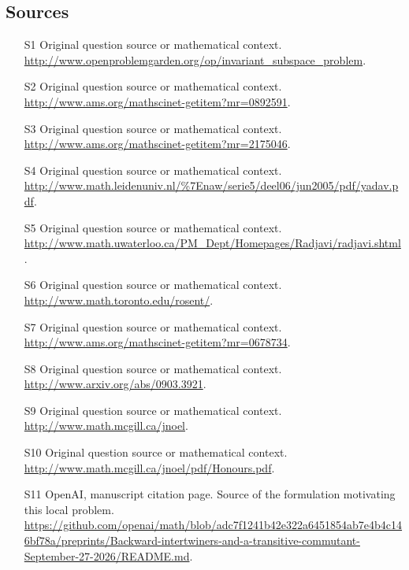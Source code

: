 \documentclass[11pt]{article}
\begin{document}
\subsection{Sources}
\begin{itemize}
\item[S1] Original question source or mathematical context.
\url{http://www.openproblemgarden.org/op/invariant_subspace_problem}.
\item[S2] Original question source or mathematical context.
\url{http://www.ams.org/mathscinet-getitem?mr=0892591}.
\item[S3] Original question source or mathematical context.
\url{http://www.ams.org/mathscinet-getitem?mr=2175046}.
\item[S4] Original question source or mathematical context.
\url{http://www.math.leidenuniv.nl/%7Enaw/serie5/deel06/jun2005/pdf/yadav.pdf}.
\item[S5] Original question source or mathematical context.
\url{http://www.math.uwaterloo.ca/PM_Dept/Homepages/Radjavi/radjavi.shtml}.
\item[S6] Original question source or mathematical context.
\url{http://www.math.toronto.edu/rosent/}.
\item[S7] Original question source or mathematical context.
\url{http://www.ams.org/mathscinet-getitem?mr=0678734}.
\item[S8] Original question source or mathematical context.
\url{http://www.arxiv.org/abs/0903.3921}.
\item[S9] Original question source or mathematical context.
\url{http://www.math.mcgill.ca/jnoel}.
\item[S10] Original question source or mathematical context.
\url{http://www.math.mcgill.ca/jnoel/pdf/Honours.pdf}.
\item[S11] OpenAI, manuscript citation page. Source of the formulation motivating this local problem.
\url{https://github.com/openai/math/blob/adc7f1241b42e322a6451854ab7e4b4c146bf78a/preprints/Backward-intertwiners-and-a-transitive-commutant-September-27-2026/README.md}.
\end{itemize}
\end{document}
